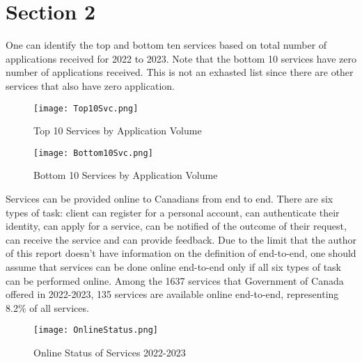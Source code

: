 \section{Section 2}

One can identify the top and bottom ten services based on total number of 
applications received for 2022 to 2023. Note that the bottom 10 services 
have zero number of applications received. This is not an exhasted list 
since there are other services that also have zero application. 

\begin{figure}[H]
    \centering
    \texttt{[image: Top10Svc.png]}
    \caption{\label{fig:Top10}Top 10 Services by Application Volume}
\end{figure}

\begin{figure}[H]
    \centering
    \texttt{[image: Bottom10Svc.png]}
    \caption{\label{fig:Bottom10}Bottom 10 Services by Application Volume}
\end{figure}

Services can be provided online to Canadians from end to end. There are 
six types of task: client can register for a personal account, can 
authenticate their identity, can apply for a service, can be notified of 
the outcome of their request, can receive the service and can provide 
feedback. Due to the limit that the author of this report doesn't have 
information on the definition of end-to-end, one should assume that 
services can be done online end-to-end only if all six types of task can 
be performed online. Among the 1637 services that Government of Canada 
offered in 2022-2023, 135 services are available online end-to-end, 
representing 8.2\% of all services.

\begin{figure}[H]
    \centering
    \texttt{[image: OnlineStatus.png]}
    \caption{\label{fig:OnlStat}Online Status of Services 2022-2023}
\end{figure}
    